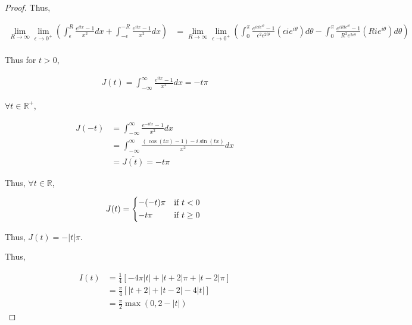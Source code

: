 \documentclass{article}
\newcommand{\R}{\mathbb{R}}
\newcommand{\abs}[1]{\left\lvert #1\right\rvert}
\begin{document}
\begin{proof}
    Thus, 

    \begin{align*}
        \lim_{R \to \infty} \lim_{\epsilon \to 0^+}\left(\int_{\epsilon}^{R} \frac{e^{itx} - 1}{x^2} dx +\int_{-\epsilon}^{-R} \frac{e^{itx} - 1}{x^2} dx\right) &= \lim_{R \to \infty} \lim_{\epsilon \to 0^+}\left(\int_{0}^{\pi} \frac{e^{i \epsilon te^{i \theta}} - 1}{\epsilon^2e^{2i\theta}}\left(\epsilon ie^{i \theta}\right) d \theta -  \int_{0}^{\pi} \frac{e^{iRte^{i \theta}} - 1}{R^2e^{2i\theta}}\left(Rie^{i \theta}\right) d \theta\right) \\
    \end{align*}

    Thus for $t > 0$, 

    \begin{align*}
        J(t) = \int_{-\infty}^{\infty}  \frac{e^{itx} - 1}{x^2} dx = -t \pi
    \end{align*}

    $\forall t \in \R^+$, 
    
    \begin{align*}
        J(-t) &= \int_{-\infty}^{\infty}  \frac{e^{-itx} - 1}{x^2} dx \\
        &= \int_{-\infty}^{\infty}  \frac{(\cos(tx) - 1) - i\sin(tx)}{x^2} dx \\
        &= \overline{J(t)} = -t \pi
    \end{align*}

    Thus, $\forall t \in \R$, 
    
    \begin{equation*}
        J(t) = \begin{cases*}
            -(-t) \pi & \text{if} $t < 0$ \\
            -t \pi & \text{if} $t \geq 0$ \\
        \end{cases*}
    \end{equation*} 

    Thus, $J(t) = -\abs{t} \pi$. 

    Thus, 
    
    \begin{align*}
        I(t) &= \frac{1}{4}\left[-4\pi\abs{t} + \abs{t + 2}\pi + \abs{t - 2} \pi\right] \\
        &= \frac{\pi}{4}\left[\abs{t + 2} + \abs{t - 2} -4\abs{t}\right] \\
        &= \frac{\pi}{2} \max(0, 2 - \abs{t})
    \end{align*}
\end{proof}
\end{document}
